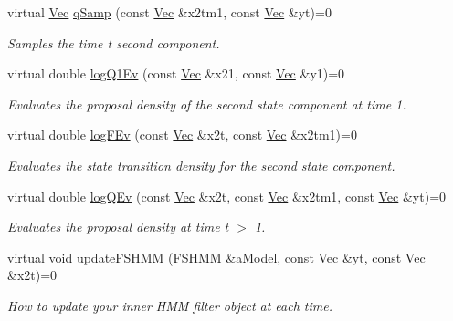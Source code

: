 \begin{DoxyCompactItemize}
virtual \hyperlink{apf__filter_8h_a4c7df05c6f5e8a0d15ae14bcdbc07152}{Vec} \hyperlink{classHmm__Rbpf_a3552390cea3b92ce312f4ebd14875f69}{q\+Samp} (const \hyperlink{apf__filter_8h_a4c7df05c6f5e8a0d15ae14bcdbc07152}{Vec} \&x2tm1, const \hyperlink{apf__filter_8h_a4c7df05c6f5e8a0d15ae14bcdbc07152}{Vec} \&yt)=0
\begin{DoxyCompactList}\small\item\em Samples the time t second component. \end{DoxyCompactList}\item 
virtual double \hyperlink{classHmm__Rbpf_a5feb153a18b40144844f343c2c1af7df}{log\+Q1\+Ev} (const \hyperlink{apf__filter_8h_a4c7df05c6f5e8a0d15ae14bcdbc07152}{Vec} \&x21, const \hyperlink{apf__filter_8h_a4c7df05c6f5e8a0d15ae14bcdbc07152}{Vec} \&y1)=0
\begin{DoxyCompactList}\small\item\em Evaluates the proposal density of the second state component at time 1. \end{DoxyCompactList}\item 
virtual double \hyperlink{classHmm__Rbpf_a94fc0439184e6f4c49de5738a0f3bbed}{log\+F\+Ev} (const \hyperlink{apf__filter_8h_a4c7df05c6f5e8a0d15ae14bcdbc07152}{Vec} \&x2t, const \hyperlink{apf__filter_8h_a4c7df05c6f5e8a0d15ae14bcdbc07152}{Vec} \&x2tm1)=0
\begin{DoxyCompactList}\small\item\em Evaluates the state transition density for the second state component. \end{DoxyCompactList}\item 
virtual double \hyperlink{classHmm__Rbpf_ae01bb25063173899739b61236d5d7b15}{log\+Q\+Ev} (const \hyperlink{apf__filter_8h_a4c7df05c6f5e8a0d15ae14bcdbc07152}{Vec} \&x2t, const \hyperlink{apf__filter_8h_a4c7df05c6f5e8a0d15ae14bcdbc07152}{Vec} \&x2tm1, const \hyperlink{apf__filter_8h_a4c7df05c6f5e8a0d15ae14bcdbc07152}{Vec} \&yt)=0
\begin{DoxyCompactList}\small\item\em Evaluates the proposal density at time t $>$ 1. \end{DoxyCompactList}\item 
virtual void \hyperlink{classHmm__Rbpf_aafd7e87c211684e8c4692646e46785ba}{update\+F\+S\+H\+MM} (\hyperlink{classFSHMM}{F\+S\+H\+MM} \&a\+Model, const \hyperlink{apf__filter_8h_a4c7df05c6f5e8a0d15ae14bcdbc07152}{Vec} \&yt, const \hyperlink{apf__filter_8h_a4c7df05c6f5e8a0d15ae14bcdbc07152}{Vec} \&x2t)=0
\begin{DoxyCompactList}\small\item\em How to update your inner H\+MM filter object at each time. \end{DoxyCompactList}\end{DoxyCompactItemize}


